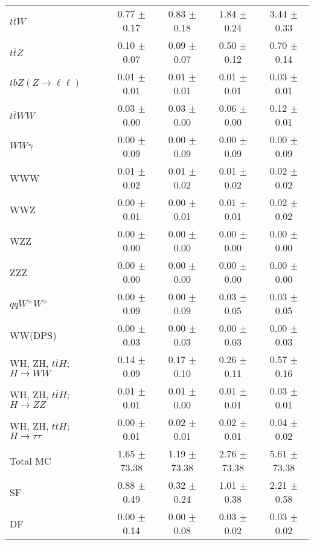 \begin{tabular}{l|cccc}
                   $t\overline{t}W$ &  0.77 $\pm$  0.17 &  0.83 $\pm$  0.18 &  1.84 $\pm$  0.24 &  3.44 $\pm$  0.33 \\
                   $t\overline{t}Z$ &  0.10 $\pm$  0.07 &  0.09 $\pm$  0.07 &  0.50 $\pm$  0.12 &  0.70 $\pm$  0.14 \\
    $tbZ (Z \rightarrow \ell \ell)$ &  0.01 $\pm$  0.01 &  0.01 $\pm$  0.01 &  0.01 $\pm$  0.01 &  0.03 $\pm$  0.01 \\
                  $t\overline{t}WW$ &  0.03 $\pm$  0.00 &  0.03 $\pm$  0.00 &  0.06 $\pm$  0.00 &  0.12 $\pm$  0.01 \\
                         $WW\gamma$ &  0.00 $\pm$  0.09 &  0.00 $\pm$  0.09 &  0.00 $\pm$  0.09 &  0.00 $\pm$  0.09 \\
                                WWW &  0.01 $\pm$  0.02 &  0.01 $\pm$  0.02 &  0.01 $\pm$  0.02 &  0.02 $\pm$  0.02 \\
                                WWZ &  0.00 $\pm$  0.01 &  0.00 $\pm$  0.01 &  0.01 $\pm$  0.01 &  0.02 $\pm$  0.02 \\
                                WZZ &  0.00 $\pm$  0.00 &  0.00 $\pm$  0.00 &  0.00 $\pm$  0.00 &  0.00 $\pm$  0.00 \\
                                ZZZ &  0.00 $\pm$  0.00 &  0.00 $\pm$  0.00 &  0.00 $\pm$  0.00 &  0.00 $\pm$  0.00 \\
                 $qqW^{\pm}W^{\pm}$ &  0.00 $\pm$  0.09 &  0.00 $\pm$  0.09 &  0.03 $\pm$  0.05 &  0.03 $\pm$  0.05 \\
                            WW(DPS) &  0.00 $\pm$  0.03 &  0.00 $\pm$  0.03 &  0.00 $\pm$  0.03 &  0.00 $\pm$  0.03 \\
WH, ZH, $t\bar{t}H$; $H \rightarrow WW$ &  0.14 $\pm$  0.09 &  0.17 $\pm$  0.10 &  0.26 $\pm$  0.11 &  0.57 $\pm$  0.16 \\
WH, ZH, $t\bar{t}H$; $H \rightarrow ZZ$ &  0.01 $\pm$  0.01 &  0.01 $\pm$  0.00 &  0.01 $\pm$  0.01 &  0.03 $\pm$  0.01 \\
WH, ZH, $t\bar{t}H$; $H \rightarrow \tau\tau$ &  0.00 $\pm$  0.01 &  0.02 $\pm$  0.01 &  0.02 $\pm$  0.01 &  0.04 $\pm$  0.02 \\
\hline\hline
                           Total MC &  1.65 $\pm$ 73.38 &  1.19 $\pm$ 73.38 &  2.76 $\pm$ 73.38 &  5.61 $\pm$ 73.38 \\
\hline
                                 SF &  0.88 $\pm$  0.49 &  0.32 $\pm$  0.24 &  1.01 $\pm$  0.38 &  2.21 $\pm$  0.58 \\
                                 DF &  0.00 $\pm$  0.14 &  0.00 $\pm$  0.08 &  0.03 $\pm$  0.02 &  0.03 $\pm$  0.02 \\

\end{tabular}
